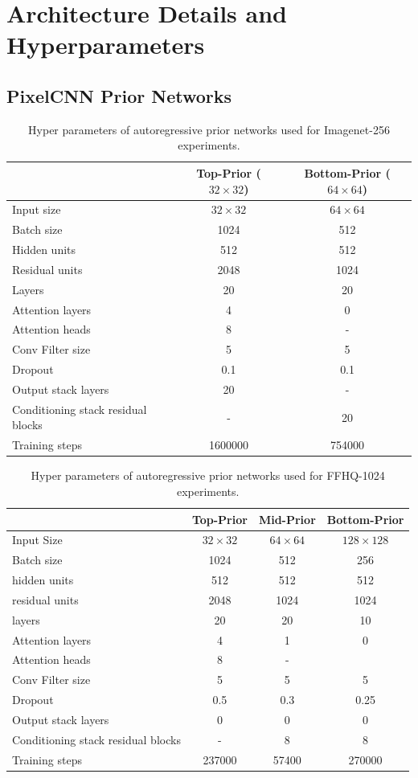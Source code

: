 \appendix

\section{Architecture Details and Hyperparameters}\label{app:arch}
\subsection{PixelCNN Prior Networks}
\begin{table}[h!]
\centering
\begin{tabular}{@{}l|cc}
             & Top-Prior ($32\times 32$) & Bottom-Prior ($64 \times 64$) \\
\toprule
 Input size  & $32 \times 32$ & $64 \times 64$ \\
 Batch size  & 1024   & 512 \\
 Hidden units & 512 & 512 \\
 Residual units & 2048 & 1024 \\
 Layers  & 20 & 20 \\
 Attention layers & 4 & 0 \\
 Attention heads & 8 & - \\
 Conv Filter size & 5 & 5\\
 Dropout & 0.1 & 0.1 \\
 Output stack layers & 20 & - \\
 Conditioning stack residual blocks & - & 20 \\
 Training steps & 1600000 & 754000 \\
\bottomrule
\end{tabular}
\caption{Hyper parameters of autoregressive prior networks used for Imagenet-256 experiments.}
\end{table}

\begin{table}[h!]
\centering
\begin{tabular}{@{}l|ccc}
     &  Top-Prior & Mid-Prior & Bottom-Prior \\
\toprule
 Input Size & $32\times 32$ & $64\times 64$ & $128 \times 128$ \\
 Batch size  & 1024   & 512 & 256\\
 hidden units & 512 & 512 & 512 \\
 residual units & 2048 & 1024 & 1024\\
 layers  & 20 & 20 & 10 \\
 Attention layers & 4 & 1 & 0\\
 Attention heads & 8 & - & \\
 Conv Filter size & 5 & 5 & 5\\
 Dropout & 0.5 & 0.3 & 0.25 \\
 Output stack layers & 0 & 0 & 0\\
 Conditioning stack residual blocks & - & 8 & 8 \\
 Training steps & 237000 & 57400 & 270000 \\
\end{tabular}
\caption{Hyper parameters of autoregressive prior networks used for FFHQ-1024 experiments.}
\end{table}


